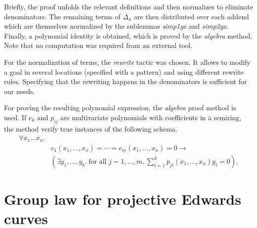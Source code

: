 \documentclass{llncs}
\begin{document}
Briefly, the proof unfolds the relevant definitions and then
normalizes to eliminate denominators. The remaining terms of
$\Delta_x$ are then distributed over each addend which are themselves
normalized by the sublemmas \textit{simp1gx} and
\textit{simp2gx}. Finally, a polynomial identity is obtained, which
is proved by the
\textit{algebra} method. Note that no computation was
required from an external tool.

For the normalization of terms, the \textit{rewrite} tactic
\cite{noschinskipattern} was chosen. It allows to modify a goal in
several locations (specified with a pattern) and using different
rewrite rules. Specifying that the rewriting happens in the
denominators is sufficient for our needs.

For proving the resulting polynomial expression, the \textit{algebra}
proof method \cite{chaieb2007context} is used. If $e_k$ and
$p_{ij}$ are multivariate polynomials with coefficients in a
semiring, the method verify true instances of the following schema.
\begin{align*}
\forall x_1 \ldots x_n. &  \\        
& e_1(x_1,\ldots,x_n) = \cdots = e_m(x_1,\ldots,x_n) = 0 \to \\
& (\exists y_1, \ldots, y_k.\ \text{for all } j=1,\ldots,m.\ 
\sum_{i=1}^k p_{ji}(x_1,\ldots,x_n) y_i = 0).
\end{align*}



\section{Group law for projective Edwards curves}\label{sec:proj}
\end{document}
